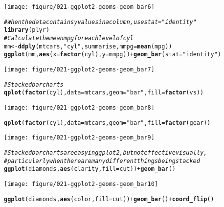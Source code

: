 \documentclass[a4paper,titlepage]{tufte-handout}\usepackage[]{graphicx}\usepackage[]{color}
\makeatletter
\def\maxwidth{ %
  \ifdim\Gin@nat@width>\linewidth
    \linewidth
  \else
    \Gin@nat@width
  \fi
}
\newcommand{\hlstr}[1]{\textcolor[rgb]{0.192,0.494,0.8}{#1}}%
\newcommand{\hlcom}[1]{\textcolor[rgb]{0.678,0.584,0.686}{\textit{#1}}}%
\newcommand{\hlopt}[1]{\textcolor[rgb]{0,0,0}{#1}}%
\newcommand{\hlstd}[1]{\textcolor[rgb]{0.345,0.345,0.345}{#1}}%
\newcommand{\hlkwb}[1]{\textcolor[rgb]{0.69,0.353,0.396}{#1}}%
\newcommand{\hlkwc}[1]{\textcolor[rgb]{0.333,0.667,0.333}{#1}}%
\newcommand{\hlkwd}[1]{\textcolor[rgb]{0.737,0.353,0.396}{\textbf{#1}}}%
\newenvironment{kframe}{%
 \def\at@end@of@kframe{}%
 \ifinner\ifhmode%
  \def\at@end@of@kframe{\end{minipage}}%
  \begin{minipage}{\columnwidth}%
 \fi\fi%
 \def\FrameCommand##1{\hskip\@totalleftmargin \hskip-\fboxsep
 \colorbox{shadecolor}{##1}\hskip-\fboxsep
     \hskip-\linewidth \hskip-\@totalleftmargin \hskip\columnwidth}%
 \MakeFramed {\advance\hsize-\width
   \@totalleftmargin\z@ \linewidth\hsize
   \@setminipage}}%
 {\par\unskip\endMakeFramed%
 \at@end@of@kframe}
\newenvironment{knitrout}{}{} %
\makeatother
\begin{document}
\begin{knitrout}
\begin{kframe}
\begin{alltt}
\end{alltt}
\end{kframe}
\texttt{[image: figure/021-ggplot2-geoms-geom\_bar6]} 
\begin{kframe}\begin{alltt}
\hlcom{# When the data contains y values in a column, use stat="identity"}
\hlkwd{library}\hlstd{(plyr)}
\hlcom{# Calculate the mean mpg for each level of cyl}
\hlstd{mm} \hlkwb{<-} \hlkwd{ddply}\hlstd{(mtcars,} \hlstr{"cyl"}\hlstd{, summarise,} \hlkwc{mmpg} \hlstd{=} \hlkwd{mean}\hlstd{(mpg))}
\hlkwd{ggplot}\hlstd{(mm,} \hlkwd{aes}\hlstd{(}\hlkwc{x} \hlstd{=} \hlkwd{factor}\hlstd{(cyl),} \hlkwc{y} \hlstd{= mmpg))} \hlopt{+} \hlkwd{geom_bar}\hlstd{(}\hlkwc{stat} \hlstd{=} \hlstr{"identity"}\hlstd{)}
\end{alltt}
\end{kframe}
\texttt{[image: figure/021-ggplot2-geoms-geom\_bar7]} 
\begin{kframe}\begin{alltt}
\hlcom{# Stacked bar charts}
\hlkwd{qplot}\hlstd{(}\hlkwd{factor}\hlstd{(cyl),} \hlkwc{data}\hlstd{=mtcars,} \hlkwc{geom}\hlstd{=}\hlstr{"bar"}\hlstd{,} \hlkwc{fill}\hlstd{=}\hlkwd{factor}\hlstd{(vs))}
\end{alltt}
\end{kframe}
\texttt{[image: figure/021-ggplot2-geoms-geom\_bar8]} 
\begin{kframe}\begin{alltt}
\hlkwd{qplot}\hlstd{(}\hlkwd{factor}\hlstd{(cyl),} \hlkwc{data}\hlstd{=mtcars,} \hlkwc{geom}\hlstd{=}\hlstr{"bar"}\hlstd{,} \hlkwc{fill}\hlstd{=}\hlkwd{factor}\hlstd{(gear))}
\end{alltt}
\end{kframe}
\texttt{[image: figure/021-ggplot2-geoms-geom\_bar9]} 
\begin{kframe}\begin{alltt}
\hlcom{# Stacked bar charts are easy in ggplot2, but not effective visually,}
\hlcom{# particularly when there are many different things being stacked}
\hlkwd{ggplot}\hlstd{(diamonds,} \hlkwd{aes}\hlstd{(clarity,} \hlkwc{fill}\hlstd{=cut))} \hlopt{+} \hlkwd{geom_bar}\hlstd{()}
\end{alltt}
\end{kframe}
\texttt{[image: figure/021-ggplot2-geoms-geom\_bar10]} 
\begin{kframe}\begin{alltt}
\hlkwd{ggplot}\hlstd{(diamonds,} \hlkwd{aes}\hlstd{(color,} \hlkwc{fill}\hlstd{=cut))} \hlopt{+} \hlkwd{geom_bar}\hlstd{()} \hlopt{+} \hlkwd{coord_flip}\hlstd{()}

\end{alltt}
\end{kframe}
\end{knitrout}
\end{document}
